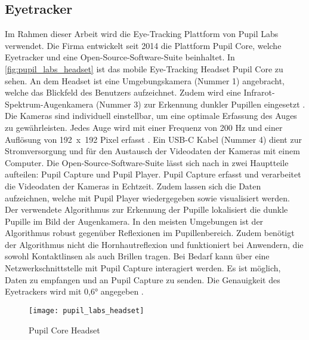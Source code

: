 \subsection{Eyetracker}
Im Rahmen dieser Arbeit wird die Eye-Tracking Plattform von Pupil Labs verwendet. Die Firma entwickelt seit 2014 die Plattform Pupil Core, welche Eyetracker und eine Open-Source-Software-Suite beinhaltet. In \autoref{fig:pupil_labs_headset} ist das mobile Eye-Tracking Headset Pupil Core zu sehen. An dem Headset ist eine Umgebungskamera (Nummer 1) angebracht, welche das Blickfeld des Benutzers aufzeichnet. Zudem wird eine Infrarot-Spektrum-Augenkamera (Nummer 3) zur Erkennung dunkler Pupillen eingesetzt \cite{Kassner_2014}. Die Kameras sind individuell einstellbar, um eine optimale Erfassung des Auges zu gewährleisten. Jedes Auge wird mit einer Frequenz von 200 Hz und einer Auflösung von \mbox{192 x 192} Pixel erfasst \cite{PupilLabsSpec}. Ein USB-C Kabel (Nummer 4) dient zur Stromversorgung und für den Austausch der Videodaten der Kameras mit einem Computer. Die Open-Source-Software-Suite lässt sich nach \citeauthor{Kassner_2014} in zwei Hauptteile aufteilen: Pupil Capture und Pupil Player. Pupil Capture erfasst und verarbeitet die Videodaten der Kameras in Echtzeit. Zudem lassen sich die Daten aufzeichnen, welche mit Pupil Player wiedergegeben sowie visualisiert werden. Der verwendete Algorithmus zur Erkennung der Pupille lokalisiert die dunkle Pupille im Bild der Augenkamera. In den meisten Umgebungen ist der Algorithmus robust gegenüber Reflexionen im Pupillenbereich. Zudem benötigt der Algorithmus nicht die Hornhautreflexion und funktioniert bei Anwendern, die sowohl Kontaktlinsen als auch Brillen tragen. \cite{Kassner_2014} Bei Bedarf kann über eine Netzwerkschnittstelle mit Pupil Capture interagiert werden. Es ist möglich, Daten zu empfangen und an Pupil Capture zu senden. \cite{PupilLabsNet} Die Genauigkeit des Eyetrackers wird mit 0,6° angegeben \cite{PupilLabsSpec}.

\begin{figure}[!htbp]
	\centering
	\texttt{[image: pupil\_labs\_headset]}
	\caption[Pupil Core Headset]{Pupil Core Headset \cite{PupilLabsHW}}
	\label{fig:pupil_labs_headset}
\end{figure}

